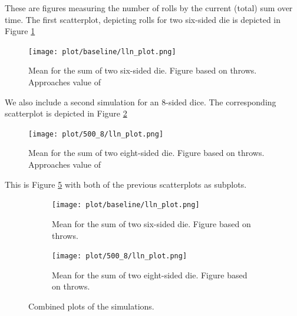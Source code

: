 \documentclass[12pt]{article}
\theoremstyle{definition}
\begin{document}
\newpage

These are figures measuring the number of rolls by the current (total) sum over time. The first scatterplot, depicting rolls for two six-sided die is depicted in Figure \ref{fig:scatter_baseline} 
\begin{figure}[tbh!]
\centering
\texttt{[image: plot/baseline/lln\_plot.png]}
\caption[]{Mean for the sum of two six-sided die. Figure based on throws. Approaches value of }
\label{fig:scatter_baseline}
\end{figure}

\newpage

We also include a second simulation for an 8-sided dice. The corresponding scatterplot is depicted in Figure 
\ref{fig:scatter_8side} 
\begin{figure}[tbh!]
\centering
\texttt{[image: plot/500\_8/lln\_plot.png]}
\caption[]{Mean for the sum of two eight-sided die. Figure based on throws. Approaches value of }
\label{fig:scatter_8side}
\end{figure}

\newpage

This is Figure \ref{fig:figsubplots2} with both of the previous scatterplots as subplots. 
\begin{figure}[tbh!]
\begin{subfigure}{.5\textwidth}
  \centering
  \texttt{[image: plot/baseline/lln\_plot.png]}  
  \caption{Mean for the sum of two six-sided die. Figure based on throws.}
  \label{fig:sub-first2}
\end{subfigure}
\begin{subfigure}{.5\textwidth}
  \centering
  \texttt{[image: plot/500\_8/lln\_plot.png]}  
  \caption{Mean for the sum of two eight-sided die. Figure based on throws.}
  \label{fig:sub-second2}
\end{subfigure}
\caption{Combined plots of the simulations.}
\label{fig:figsubplots2}
\end{figure} \\[12pt] 
\end{document}
